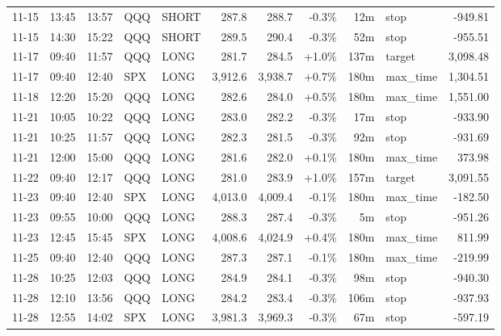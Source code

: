\documentclass[11pt,a4paper,twoside]{article}
\begin{document}
\begin{center}
\begin{longtable}{>{\color{txtmain}}l l l l l r r r r >{\color{txtmain}}l r}
11-15 & 13:45 & 13:57 & QQQ & SHORT & 287.8 & 288.7 & \textcolor{lossred}{-0.3\%} & 12m & stop & \textcolor{lossred}{-949.81} \\
11-15 & 14:30 & 15:22 & QQQ & SHORT & 289.5 & 290.4 & \textcolor{lossred}{-0.3\%} & 52m & stop & \textcolor{lossred}{-955.51} \\
11-17 & 09:40 & 11:57 & QQQ & LONG & 281.7 & 284.5 & \textcolor{wingreen}{+1.0\%} & 137m & target & \textcolor{wingreen}{3,098.48} \\
11-17 & 09:40 & 12:40 & SPX & LONG & 3,912.6 & 3,938.7 & \textcolor{wingreen}{+0.7\%} & 180m & max\_time & \textcolor{wingreen}{1,304.51} \\
11-18 & 12:20 & 15:20 & QQQ & LONG & 282.6 & 284.0 & \textcolor{wingreen}{+0.5\%} & 180m & max\_time & \textcolor{wingreen}{1,551.00} \\
11-21 & 10:05 & 10:22 & QQQ & LONG & 283.0 & 282.2 & \textcolor{lossred}{-0.3\%} & 17m & stop & \textcolor{lossred}{-933.90} \\
11-21 & 10:25 & 11:57 & QQQ & LONG & 282.3 & 281.5 & \textcolor{lossred}{-0.3\%} & 92m & stop & \textcolor{lossred}{-931.69} \\
11-21 & 12:00 & 15:00 & QQQ & LONG & 281.6 & 282.0 & \textcolor{wingreen}{+0.1\%} & 180m & max\_time & \textcolor{wingreen}{373.98} \\
11-22 & 09:40 & 12:17 & QQQ & LONG & 281.0 & 283.9 & \textcolor{wingreen}{+1.0\%} & 157m & target & \textcolor{wingreen}{3,091.55} \\
11-23 & 09:40 & 12:40 & SPX & LONG & 4,013.0 & 4,009.4 & \textcolor{lossred}{-0.1\%} & 180m & max\_time & \textcolor{lossred}{-182.50} \\
11-23 & 09:55 & 10:00 & QQQ & LONG & 288.3 & 287.4 & \textcolor{lossred}{-0.3\%} & 5m & stop & \textcolor{lossred}{-951.26} \\
11-23 & 12:45 & 15:45 & SPX & LONG & 4,008.6 & 4,024.9 & \textcolor{wingreen}{+0.4\%} & 180m & max\_time & \textcolor{wingreen}{811.99} \\
11-25 & 09:40 & 12:40 & QQQ & LONG & 287.3 & 287.1 & \textcolor{lossred}{-0.1\%} & 180m & max\_time & \textcolor{lossred}{-219.99} \\
11-28 & 10:25 & 12:03 & QQQ & LONG & 284.9 & 284.1 & \textcolor{lossred}{-0.3\%} & 98m & stop & \textcolor{lossred}{-940.30} \\
11-28 & 12:10 & 13:56 & QQQ & LONG & 284.2 & 283.4 & \textcolor{lossred}{-0.3\%} & 106m & stop & \textcolor{lossred}{-937.93} \\
11-28 & 12:55 & 14:02 & SPX & LONG & 3,981.3 & 3,969.3 & \textcolor{lossred}{-0.3\%} & 67m & stop & \textcolor{lossred}{-597.19} \\

\end{longtable}
\end{center}
\end{document}
